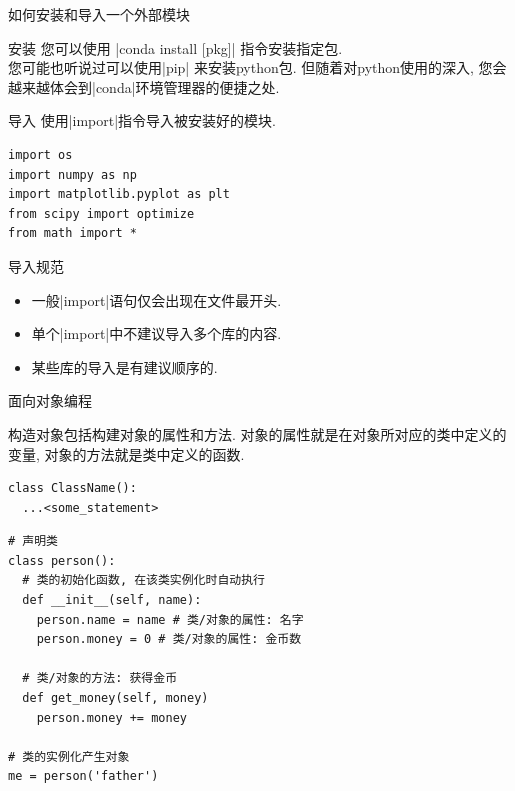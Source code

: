 \documentclass{beamer}
\begin{document}
    \begin{frame}[fragile]{如何安装和导入一个外部模块}
      \begin{block}{安装}
        您可以使用 \cverb|conda install [pkg]| 指令安装指定包.\\ 
        {\tiny 您可能也听说过可以使用\cverb|pip| 来安装python包. 但随着对python使用的深入, 您会越来越体会到\cverb|conda|环境管理器的便捷之处.}
      \end{block}
      \begin{block}{导入}
        使用\cverb|import|指令导入被安装好的模块.
        \begin{lstlisting}
import os
import numpy as np
import matplotlib.pyplot as plt
from scipy import optimize
from math import *
        \end{lstlisting}
      \end{block}
      \begin{block}{导入规范}
        \begin{itemize}
          \item 一般\cverb|import|语句仅会出现在文件最开头.
          \item 单个\cverb|import|中不建议导入多个库的内容.
          \item 某些库的导入是有建议顺序的.
        \end{itemize}
      \end{block}
    \end{frame}
    \begin{frame}[fragile]{面向对象编程}
      \begin{block}{}\small
        构造对象包括构建对象的属性和方法. 对象的属性就是在对象所对应的类中定义的变量, 对象的方法就是类中定义的函数.
        \begin{lstlisting}
class ClassName():
  ...<some_statement>
        \end{lstlisting}
      \end{block}
      \begin{exampleblock}{}
        \begin{lstlisting}
# 声明类
class person():
  # 类的初始化函数, 在该类实例化时自动执行
  def __init__(self, name):
    person.name = name # 类/对象的属性: 名字
    person.money = 0 # 类/对象的属性: 金币数
  
  # 类/对象的方法: 获得金币
  def get_money(self, money) 
    person.money += money

# 类的实例化产生对象
me = person('father')
        \end{lstlisting}
      \end{exampleblock}
    \end{frame}
\end{document}

